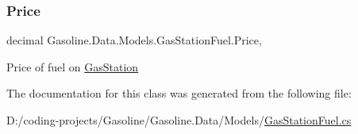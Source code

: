 \subsubsection{\texorpdfstring{Price}{Price}}
{\footnotesize\ttfamily decimal Gasoline.\+Data.\+Models.\+Gas\+Station\+Fuel.\+Price\hspace{0.3cm}{\ttfamily [get]}, {\ttfamily [set]}}



Price of fuel on \mbox{\hyperlink{class_gasoline_1_1_data_1_1_models_1_1_gas_station}{Gas\+Station}} 



The documentation for this class was generated from the following file\+:\begin{DoxyCompactItemize}
\item 
D\+:/coding-\/projects/\+Gasoline/\+Gasoline.\+Data/\+Models/\mbox{\hyperlink{_gas_station_fuel_8cs}{Gas\+Station\+Fuel.\+cs}}\end{DoxyCompactItemize}
